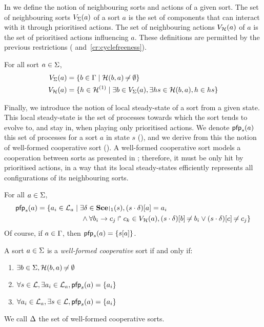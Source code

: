 In  we define the notion of neighbouring sorts and actions of a given sort.
The set of neighbouring sorts $V_\Sigma(a)$ of a sort $a$ is the set of components that can interact with it through prioritised actions.
The set of neighbouring actions $V_{\mathcal{H}}(a)$ of $a$ is the set of prioritised actions influencing $a$.
These definitions are permitted by the previous restrictions ( and~\ref{cr:cyclefreeness}).
\begin{definition}[$\Vs : \PHs \rightarrow \powerset(\PHsort)$; $\Vh : \PHs \rightarrow \powerset(\PHh)$]
\label{def:neighbours}
  For all sort $a \in \Sigma$,
  \begin{align*}
    V_\Sigma(a) &= \{ b \in \Gamma \mid \mathcal{H}(b, a) \not\nobreak\mkern -2mu = \emptyset \}\\
    V_{\mathcal{H}}(a) &= \{ h \in \mathcal{H}^{(1)} \mid \exists b \in V_\Sigma(a), \exists hs \in \mathcal{H}(b,a), h \in hs \}
  \end{align*}
\end{definition}

Finally, we introduce the notion of local steady-state of a sort from a given state.
This local steady-state is the set of processes towards which the sort tends to evolve to, and stay in, when playing only prioritised actions.
We denote $\mathsf{pfp}_s(a)$ this set of processes for a sort $a$ in state $s$ (),
and we derive from this the notion of well-formed cooperative sort ().
A well-formed cooperative sort models a cooperation between sorts as presented in ;
therefore, it must be only hit by prioritised actions,
in a way that its local steady-states efficiently represents all configurations of its neighbouring sorts.
\begin{definition}[$\pfp : \PHs \rightarrow \powerset(\PHproc)$]
\label{def:pfp}
  For all $a \in \Sigma$,
  \begin{align*}
    \pfp_s(a) = \{ a_i \in \PHl_a &\mid \exists \delta \in \restriction{\Sce}{1}(s), \PHget{(s \PHplay \delta)}{a} = a_i \\
    & \quad \wedge \forall \PHhit{b_i}{c_j}{c_k} \in \Vh(a), \PHget{(s \PHplay \delta)}{b} \neq b_i \vee \PHget{(s \PHplay \delta)}{c} \neq c_j \}
  \end{align*}
  Of course, if $a \in \Gamma$, then $\mathsf{pfp}_s(a) = \{ {s[a]} \}$.
\end{definition}
%
\begin{definition}
\label{def:cs}
  A sort $a \in \Sigma$ is a \emph{well-formed cooperative} sort if and only if:
  \begin{enumerate}
    \item $\exists b \in \Sigma, \mathcal{H}(b, a) \not\nobreak\mkern -2mu = \emptyset$
    \item \label{csai} $\forall s \in \mathcal{L}, \exists a_i \in \mathcal{L}_a, \mathsf{pfp}_s(a) = \{ a_i \}$
    \item \label{css} $\forall a_i \in \mathcal{L}_a, \exists s \in \mathcal{L}, \mathsf{pfp}_s(a) = \{ a_i \}$
  \end{enumerate}
  We call $\Delta$ the set of well-formed cooperative sorts.
\end{definition}

